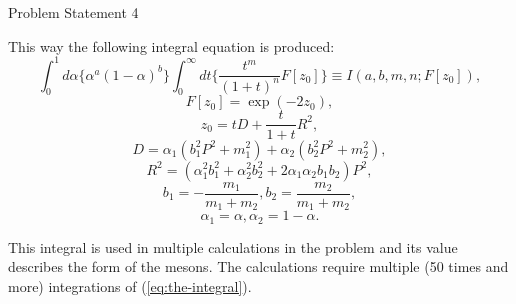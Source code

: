 \documentclass[9pt]{beamer}
\begin{document}
\begin{frame}{Problem Statement 4}

This way the following integral equation is produced:
\begin{equation}
    \label{eq:the-integral}
    \int_{0}^{1}d\alpha\{\alpha^{a}(1 - \alpha)^b\}\int_{0}^{\infty}dt\{\frac{t^m}{(1+t)^n}F[z_{0}]\} \equiv I(a, b, m, n; F[z_{0}]),
\end{equation}
\begin{equation*}   
    F[z_0] = \exp(-2z_0),
\end{equation*}
\begin{equation*} 
    z_0 = tD + \frac{t}{1 + t}R^2,
\end{equation*}
\begin{equation*}     
    D = \alpha_1(b_1^{2}P^2 + m_1^2) + \alpha_2(b_2^{2}P^2 + m_2^2),
\end{equation*}
\begin{equation*} 
        R^2 = (\alpha_1^{2}b_1^2 + \alpha_2^{2}b_2^2 + 2\alpha_{1}\alpha_{2}b_{1}b_2)P^2,
\end{equation*}
\begin{equation*} 
    b_1 = -\frac{m_1}{m_1 + m_2},
    b_2 = \frac{m_2}{m_1 + m_2},
\end{equation*}
\begin{equation*}
    \alpha_1 = \alpha, \alpha_2 = 1 - \alpha.
\end{equation*}


\noindent This integral is used in multiple calculations in the problem and its value describes the form of the mesons. The calculations require multiple (50 times and more) integrations of (\ref{eq:the-integral}).
    
\end{frame}
\end{document}
